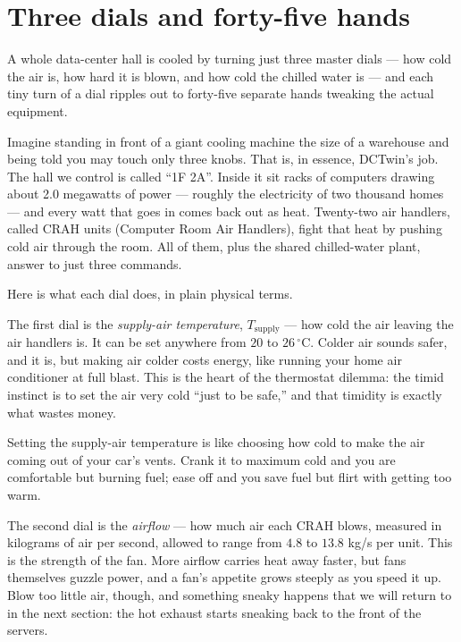 \documentclass[11pt]{report}
\begin{document}
\section{Three dials and forty-five hands}

\begin{keyidea}
A whole data-center hall is cooled by turning just three master dials --- how cold the air is, how hard it is blown, and how cold the chilled water is --- and each tiny turn of a dial ripples out to forty-five separate hands tweaking the actual equipment.
\end{keyidea}

Imagine standing in front of a giant cooling machine the size of a warehouse and being told you may touch only three knobs. That is, in essence, DCTwin's job. The hall we control is called ``1F 2A''. Inside it sit racks of computers drawing about 2.0 megawatts of power --- roughly the electricity of two thousand homes --- and every watt that goes in comes back out as heat. Twenty-two air handlers, called CRAH units (Computer Room Air Handlers), fight that heat by pushing cold air through the room. All of them, plus the shared chilled-water plant, answer to just three commands.

Here is what each dial does, in plain physical terms.

The first dial is the \emph{supply-air temperature}, $T_{\text{supply}}$ --- how cold the air leaving the air handlers is. It can be set anywhere from $20$ to $26\,^\circ$C. Colder air sounds safer, and it is, but making air colder costs energy, like running your home air conditioner at full blast. This is the heart of the thermostat dilemma: the timid instinct is to set the air very cold ``just to be safe,'' and that timidity is exactly what wastes money.

\begin{analogy}
Setting the supply-air temperature is like choosing how cold to make the air coming out of your car's vents. Crank it to maximum cold and you are comfortable but burning fuel; ease off and you save fuel but flirt with getting too warm.
\end{analogy}

The second dial is the \emph{airflow} --- how much air each CRAH blows, measured in kilograms of air per second, allowed to range from $4.8$ to $13.8$ kg/s per unit. This is the strength of the fan. More airflow carries heat away faster, but fans themselves guzzle power, and a fan's appetite grows steeply as you speed it up. Blow too little air, though, and something sneaky happens that we will return to in the next section: the hot exhaust starts sneaking back to the front of the servers.
\end{document}

